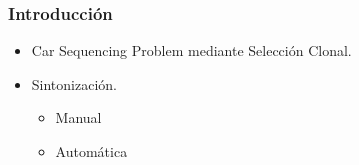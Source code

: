 \frame
{
\frametitle{Introducción}
\begin{itemize}
	\item Car Sequencing Problem mediante Selección Clonal.
	\item Sintonización.
	\begin{itemize}
		\item Manual
		\item Automática
	\end{itemize}
\end{itemize}
}

